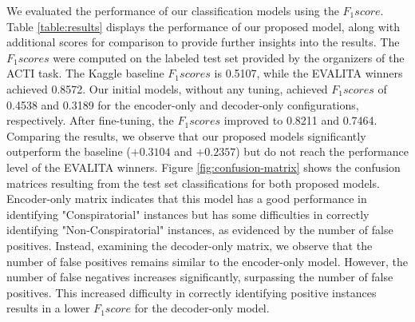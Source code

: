 \documentclass[11pt]{article}
\begin{document}
We evaluated the performance of our classification models using the $F_1 score$. 
Table \ref{table:results} displays the performance of our proposed model, 
along with additional scores for comparison to provide further insights into the results. 
The $F_1 scores$ were computed on the labeled test set provided by the organizers of the ACTI task.
The Kaggle baseline $F_1 scores$ is 0.5107, while the EVALITA winners achieved 0.8572. 
Our initial models, without any tuning, achieved $F_1 scores$ of 0.4538 and 0.3189 for the encoder-only 
and decoder-only configurations, respectively. After fine-tuning, the $F_1 scores$ improved to 0.8211 and 0.7464.
Comparing the results, we observe that our proposed models significantly 
outperform the baseline ($ +0.3104 $ and $+0.2357$) but do not reach the performance level of the EVALITA winners.
Figure \ref{fig:confusion-matrix} shows the confusion matrices resulting from 
the test set classifications for both proposed models. 
Encoder-only matrix indicates that this model has a good 
performance in identifying "Conspiratorial" instances but has some difficulties in 
correctly identifying "Non-Conspiratorial" instances, as evidenced by the number of false positives. 
Instead, examining the decoder-only matrix, we observe that the number of false positives 
remains similar to the encoder-only model. However, the number of false negatives increases 
significantly, surpassing the number of false positives. 
This increased difficulty in correctly identifying positive instances 
results in a lower $F_1 score$ for the decoder-only model.



\end{document}
